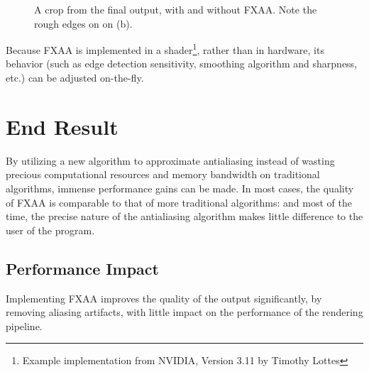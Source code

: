 \documentclass[11pt, oneside]{report}
\begin{document}
\begin{figure}[!htbp]
  \centering
  \hfill
  \caption{A crop from the final output, with and without FXAA. Note the rough edges on on (b).}
\end{figure}

Because \gls{FXAA} is implemented in a shader\footnote{Example implementation from NVIDIA, Version 3.11 by Timothy Lottes}, rather than in hardware, its behavior (such as edge detection sensitivity, smoothing algorithm and sharpness, etc.) can be adjusted on-the-fly. 

\section{End Result}
By utilizing a new algorithm to approximate antialiasing instead of wasting precious computational resources and \gls{memory bandwidth} on traditional algorithms, immense performance gains can be made. In most cases, the quality of \gls{FXAA} is comparable to that of more traditional algorithms: and most of the time, the precise nature of the antialiasing algorithm makes little difference to the user of the program.

\subsection{Performance Impact}
Implementing \gls{FXAA} improves the quality of the output significantly, by removing \gls{aliasing} artifacts, with little impact on the performance of the rendering pipeline.
\end{document}
